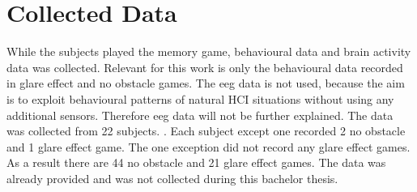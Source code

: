 \chapter{Collected Data}
\label{collected_data}
While the subjects played the memory game, behavioural data and brain activity data was collected. Relevant for this work is only the behavioural data recorded in glare effect and no obstacle games.
The eeg data is not used, because the aim is to exploit behavioural patterns of natural HCI situations without using any additional sensors. %
Therefore eeg data will not be further explained. The data was collected from 22 subjects. . Each subject except one recorded 2 no obstacle and 1 glare effect game. The one exception did not record any glare effect games. As a result there are 44 no obstacle and 21 glare effect games. The data was already provided and was not collected during this bachelor thesis.


